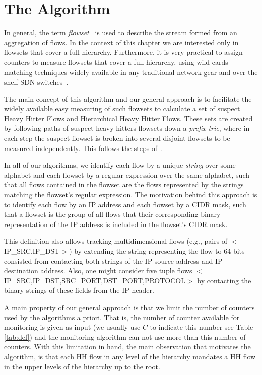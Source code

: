 \section{The \simpleAlgo Algorithm}

In general, the term \textit{flowset}~\cite{conf/sigcomm/YuanCM07} is used to describe the stream formed from an aggregation of flows.
In the context of this chapter we are interested only in flowsets that cover a full hierarchy.
Furthermore, it is very practical to assign counters to measure flowsets that cover a full hierarchy, using wild-cards matching techniques widely available in any traditional network gear and over the shelf SDN switches~\cite{OVS, OF1.5}.



The main concept of this algorithm and our general approach is to facilitate the widely available easy measuring of such flowsets to calculate a set of suspect Heavy Hitter Flows and Hierarchical Heavy Hitter Flows. These sets are created by following paths of suspect heavy hitters flowsets down a \textit{prefix trie}, where in each step the suspect flowset is broken into several disjoint flowsets to be measured independently. This follows the steps of~\cite{conf/sigcomm/YuanCM07,Moraney2016}.

In all of our algorithms, we identify each flow by a unique \textit{string} over some alphabet and each flowset by a regular expression over the same alphabet, such that all flows contained in the flowset are the flows represented by the strings matching the flowset's regular expression. The motivation behind this approach is to identify each flow by an IP address and each flowset by a CIDR mask, such that a flowset is the group of all flows that their corresponding binary representation of the IP address is included in the flowset's CIDR mask.

This definition also allows tracking multidimensional flows (e.g., pairs of $<$IP\_SRC,IP\_DST$>$) by extending the string representing the flow to 64 bits consisted from contacting both strings of the IP source address and IP destination address. Also, one might consider five tuple flows $<$IP\_SRC,IP\_DST,SRC\_PORT,DST\_PORT,PROTOCOL$>$ by contacting the binary strings of these fields from the IP header.

A main property of our general approach is that we limit the number of counters used by the algorithms a priori. That is, the number of counter available for monitoring is given as input (we usually use $C$ to indicate this number see Table \ref{tab:def}) and the monitoring algorithm can not use  more than this number of counters.
With this limitation in hand, the main observation that motivates the algorithm, is that each HH flow in any level of the hierarchy mandates a HH flow in the upper levels of the hierarchy up to the root.


